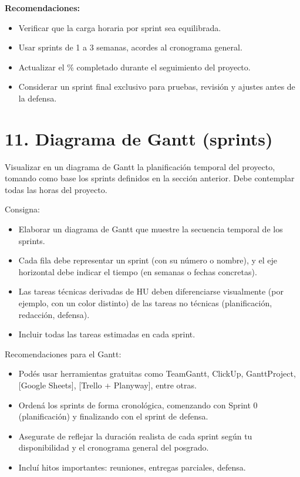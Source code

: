 \documentclass[
11pt, %
]{charter}
\begin{document}
\textbf{Recomendaciones:}
\begin{itemize}
  \item Verificar que la carga horaria por sprint sea equilibrada.
  \item Usar sprints de 1 a 3 semanas, acordes al cronograma general.
  \item Actualizar el \% completado durante el seguimiento del proyecto.
  \item Considerar un sprint final exclusivo para pruebas, revisión y ajustes antes de la defensa.
\end{itemize}


\section{11. Diagrama de Gantt (sprints)}
\label{sec:gantt}

Visualizar en un diagrama de Gantt la planificación temporal del proyecto, tomando como base los sprints definidos en la sección anterior. Debe contemplar todas las horas del proyecto.

Consigna:

\begin{itemize}

\item Elaborar un diagrama de Gantt que muestre la secuencia temporal de los sprints.

\item Cada fila debe representar un sprint (con su número o nombre), y el eje horizontal debe indicar el tiempo (en semanas o fechas concretas).

\item Las tareas técnicas derivadas de HU deben diferenciarse visualmente (por ejemplo, con un color distinto) de las tareas no técnicas (planificación, redacción, defensa).

\item Incluir todas las tareas estimadas en cada sprint.
\end{itemize}

Recomendaciones para el Gantt:

\begin{itemize}

	\item Podés usar herramientas gratuitas como TeamGantt, ClickUp, GanttProject, [Google Sheets], [Trello + Planyway], entre otras.
	\item Ordená los sprints de forma cronológica, comenzando con Sprint 0 (planificación) y finalizando con el sprint de defensa.
	\item Asegurate de reflejar la duración realista de cada sprint según tu disponibilidad y el cronograma general del posgrado.
	\item Incluí hitos importantes: reuniones, entregas parciales, defensa.
\end{itemize}
\end{document}
